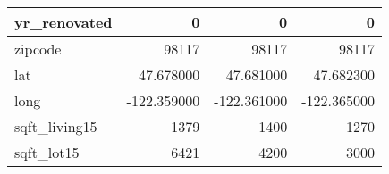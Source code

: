 \begin{table}[H]
\begin{tabular}{|l|r|r|r|}
\hline yr\_renovated & \cellcolor[rgb]{0.9, 0.54, 0.52} 0 & \cellcolor[rgb]{0.9, 0.54, 0.52} 0 & \cellcolor[rgb]{0.9, 0.54, 0.52} 0 \\
\hline zipcode & \cellcolor[rgb]{0.9, 0.54, 0.52} 98117 & \cellcolor[rgb]{0.9, 0.54, 0.52} 98117 & \cellcolor[rgb]{0.9, 0.54, 0.52} 98117 \\
\hline lat & \cellcolor[rgb]{0.9, 0.54, 0.52} 47.678000 & 47.681000 & 47.682300 \\
\hline long & \cellcolor[rgb]{0.9, 0.54, 0.52} -122.359000 & \cellcolor[rgb]{0.9, 0.54, 0.52} -122.361000 & \cellcolor[rgb]{0.9, 0.54, 0.52} -122.365000 \\
\hline sqft\_living15 & \cellcolor[rgb]{0.9, 0.54, 0.52} 1379 & 1400 & 1270 \\
\hline sqft\_lot15 & \cellcolor[rgb]{0.9, 0.54, 0.52} 6421 & 4200 & 3000 \\
\hline
\end{tabular}
\end{table}

